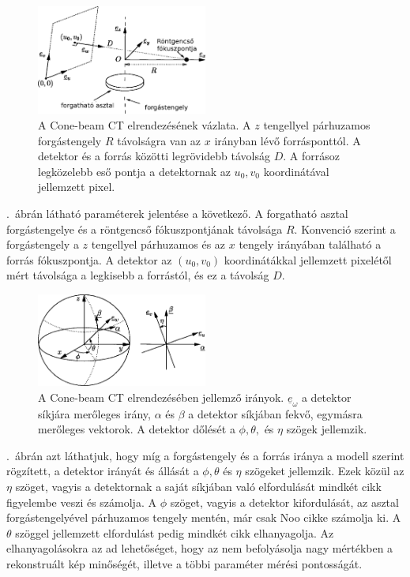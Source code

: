 \documentclass[a4paper,12pt]{article}
\begin{document}
\begin{figure}[htbp]
\center
\includegraphics[width=0.5\textwidth]{abrak/geom1}
\caption{A Cone-beam CT elrendezésének vázlata\cite{noo}. A $z$ tengellyel párhuzamos forgástengely $R$ távolságra van az $x$ irányban lévő forrásponttól. A detektor és a forrás közötti legrövidebb távolság $D$. A forrásoz legközelebb eső pontja a detektornak az $u_0,v_0$ koordinátával jellemzett pixel. }
\label{fig:geom1}
\end{figure}





.~ábrán látható paraméterek jelentése a következő. A forgatható asztal forgástengelye és a röntgencső fókuszpontjának távolsága $R$. Konvenció szerint a forgástengely a $z$ tengellyel párhuzamos és az $x$ tengely irányában található a forrás fókuszpontja. A detektor az $(u_0,v_0)$ koordinátákkal jellemzett pixelétől mért távolsága a legkisebb a forrástól, és ez a távolság $D$.


\begin{figure}[htbp]
\center
\includegraphics[width=0.5\textwidth]{abrak/geom2}
\caption{A Cone-beam CT elrendezésében jellemző irányok\cite{noo}. $\underline{e}_\omega$ a detektor síkjára merőleges irány, $\alpha$ és $\beta$ a detektor síkjában fekvő, egymásra merőleges vektorok. A detektor dőlését a $\phi, \theta,$ és $\eta$ szögek jellemzik.}
\label{fig:geom2}
\end{figure}



 .~ábrán azt láthatjuk, hogy míg a forgástengely és a forrás iránya  a modell szerint rögzített, a detektor irányát és állását a   $\phi, \theta$ és $\eta$ szögeket jellemzik. Ezek közül az $\eta$ szöget, vagyis a detektornak a saját síkjában való elfordulását mindkét cikk figyelembe veszi és számolja. A $\phi$ szöget, vagyis a detektor kifordulását, az asztal forgástengelyével párhuzamos tengely mentén, már csak Noo\cite{noo} cikke számolja ki. A $\theta$  szöggel jellemzett elfordulást pedig mindkét cikk elhanyagolja. Az elhanyagolásokra az ad lehetőséget, hogy az nem befolyásolja nagy mértékben a rekonstruált kép minőségét, illetve a többi paraméter mérési pontosságát\cite{wu}. 
\end{document}
